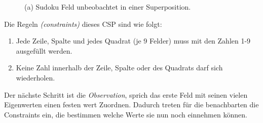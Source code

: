 \documentclass[12pt, a4paper,twoside,openright]{report} %
\begin{document}
\begin{figure}[H]
    \centering
    \caption{(a) Sudoku Feld unbeobachtet in einer Superposition.}%
\end{figure}

Die Regeln \textit{(constraints)} dieses CSP sind wie folgt:
\begin{enumerate}
    \item Jede Zeile, Spalte und jedes Quadrat {(je 9 Felder)} muss mit den Zahlen 1-9 ausgefüllt werden.
    \item Keine Zahl innerhalb der Zeile, Spalte oder des Quadrats darf sich wiederholen.
\end{enumerate}

Der nächste Schritt ist die \textit{Observation}, sprich das erste Feld mit seinen vielen Eigenwerten einen festen wert Zuordnen.
Dadurch treten für die benachbarten die Constraints ein, die bestimmen welche Werte sie nun noch einnehmen können.
\end{document}
